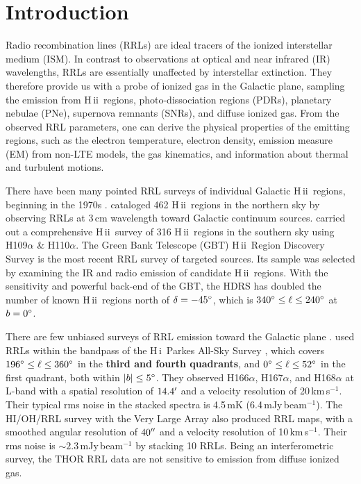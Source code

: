 \documentclass[manuscript]{aastex61}
\newcommand{\hii}{{\rm H\,}{{\sc ii}}}
\newcommand{\hi}{{\rm H\,}{{\sc i}}}
\newcommand{\kms}{\,km\,s$^{-1}$}
\begin{document}
\keywords{radio lines: ISM --- \hii\ regions --- catalogs --- surveys}

\section{Introduction} \label{sec_intr}
Radio recombination lines (RRLs) are ideal tracers of the ionized interstellar medium (ISM).
In contrast to observations at optical and near infrared (IR) wavelengths, RRLs are essentially unaffected by interstellar extinction.  They therefore provide us with a probe of ionized gas in the Galactic plane, sampling the emission from \hii\ regions, photo-dissociation regions (PDRs), planetary nebulae (PNe), supernova remnants (SNRs), and diffuse ionized gas.  From the observed RRL parameters, one can derive the physical properties of the emitting regions, such as the electron temperature, electron density, emission measure (EM) from non-LTE models, the gas kinematics, and information about thermal and turbulent motions.

There have been many pointed RRL surveys of individual Galactic \hii\ regions, beginning in the 1970s \citep[e.g.][]{Reifenstein1970,Wilson1970,Churchwell1978}.
\citet{Lockman1989} cataloged 462 \hii\ regions in the northern sky by observing RRLs at 3\,cm wavelength toward Galactic continuum sources.
\citet{Caswell1987} carried out a comprehensive \hii\ survey of 316 \hii\ regions in the southern sky using H109$\alpha$ \& H110$\alpha$.
The Green Bank Telescope (GBT) \hii\ Region Discovery Survey \citep[GBT HRDS;][]{Bania2010,Anderson2011,Anderson2015} is the most recent RRL survey of targeted sources.
Its sample was selected by examining the IR and radio emission of candidate \hii\ regions. 
With the sensitivity and powerful back-end of the GBT, the HDRS has doubled the number of known \hii\ regions north of $\delta=-45\mbox{$^\circ$}$, which is $340\mbox{$^\circ$} \leq \ell \leq 240\mbox{$^\circ$}$ at $b = 0\mbox{$^\circ$}$.

There are few unbiased surveys of RRL emission toward the Galactic plane \citep[e.g.,][]{Lockman1976,Anantharamaiah1986,Roshi2000}.
\citet{Alves2010,Alves2012,Alves2015} used RRLs within the bandpass of the \hi\ Parkes All-Sky Survey \citep[HIPASS;][]{Staveley1996}, which covers $196\mbox{$^\circ$} \leq \ell \leq 360\mbox{$^\circ$}$ in the \textbf{third and fourth quadrants}, and $0\mbox{$^\circ$} \leq \ell \leq 52\mbox{$^\circ$}$ in the first quadrant, both within $|b| \leq 5\mbox{$^\circ$}$.
They observed H166$\alpha$, H167$\alpha$, and H168$\alpha$ at L-band with a spatial resolution of $14.4\mbox{$^\prime$}$ and a velocity resolution of 20\kms. 
Their typical rms noise in the stacked spectra is 4.5\,mK (6.4\,mJy\,beam$^{-1}$).
The HI/OH/RRL survey with the Very Large Array \citep[THOR;][]{Beuther2016} also produced RRL maps, with a smoothed angular resolution of $40\mbox{$^{\prime\prime}$}$ and a velocity resolution of 10\kms. Their rms noise is $\sim2.3$\,mJy\,beam$^{-1}$ by stacking 10 RRLs.
Being an interferometric survey, the THOR RRL data are not sensitive to emission from diffuse ionized gas.
\end{document}
